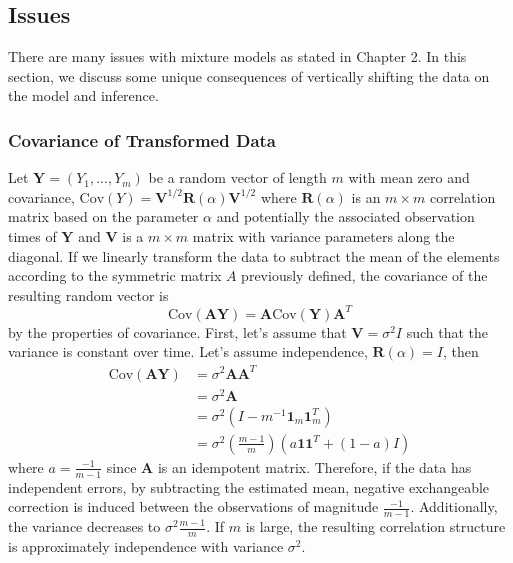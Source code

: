 \documentclass[12pt]{article}
\newcommand{\B}[0]{\mathbf}
\newcommand{\Cov}[0]{\text{Cov}}
\begin{document}
\subsection{Issues}
There are many issues with mixture models as stated in Chapter 2. In this section, we discuss some unique consequences of vertically shifting the data on the model and inference.
\subsubsection{Covariance of Transformed Data}
Let $\B Y=(Y_{1},...,Y_{m})$ be a random vector of length $m$ with mean zero and covariance, $\Cov(Y) = \B V^{1/2}\B R(\alpha)\B V^{1/2}$ where $\B R(\alpha)$ is an $m\times m$ correlation matrix based on the parameter $\alpha$ and potentially the associated observation times of $\B Y$ and $\B V$ is a $m\times m$ matrix with variance parameters along the diagonal. If we linearly transform the data to subtract the mean of the elements according to the symmetric matrix $A$ previously defined, the covariance of the resulting random vector is
$$\Cov(\B A\B Y) = \B A\Cov(\B Y)\B A^{T}$$
by the properties of covariance. First, let's assume that $\B V=\sigma^{2}I$ such that the variance is constant over time. Let's assume independence, $\B R(\alpha)=I$, then
\begin{align*} 
\Cov(\B A\B Y) &= \sigma^{2}\B A\B A^{T} \\
&=\sigma^{2}\B A\\
&= \sigma^{2}(I - m^{-1}\B1_{m}\B1_{m}^{T})\\
&=\sigma^{2}\left(\frac{m-1}{m}\right)(a\B 1\B 1^{T}+ (1-a)I)
\end{align*}
 where $a=\frac{-1}{m-1}$ since $\B A$ is an idempotent matrix. Therefore, if the data has independent errors, by subtracting the estimated mean, negative exchangeable correction is induced between the observations of magnitude $\frac{-1}{m-1}$. Additionally, the variance decreases to $\sigma^{2}\frac{m-1}{m}$. If $m$ is large, the resulting correlation structure is approximately independence with variance $\sigma^{2}$.\\
 
\end{document}
